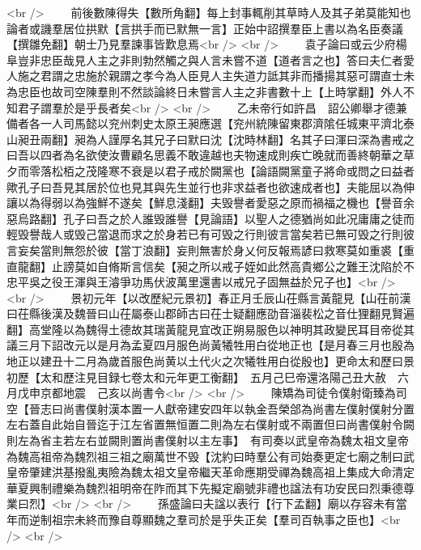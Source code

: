 <br />
　　前後數陳得失【數所角翻】每上封事輒削其草時人及其子弟莫能知也論者或譏羣居位拱默【言拱手而已默無一言】正始中詔撰羣臣上書以為名臣奏議【撰雛免翻】朝士乃見羣諫事皆歎息焉<br />
<br />
　　袁子論曰或云少府楊阜豈非忠臣哉見人主之非則勃然觸之與人言未嘗不道【道者言之也】答曰夫仁者愛人施之君謂之忠施於親謂之孝今為人臣見人主失道力詆其非而播揚其惡可謂直士未為忠臣也故司空陳羣則不然談論終日未嘗言人主之非書數十上【上時掌翻】外人不知君子謂羣於是乎長者矣<br />
<br />
　　乙未帝行如許昌　詔公卿舉才德兼備者各一人司馬懿以兖州刺史太原王昶應選【兖州統陳留東郡濟隂任城東平濟北泰山昶丑兩翻】昶為人謹厚名其兄子曰默曰沈【沈時林翻】名其子曰渾曰深為書戒之曰吾以四者為名欲使汝曹顧名思義不敢違越也夫物速成則疾亡晚就而善終朝華之草夕而零落松栢之茂隆寒不衰是以君子戒於闕黨也【論語闕黨童子將命或問之曰益者歟孔子曰吾見其居於位也見其與先生並行也非求益者也欲速成者也】夫能屈以為伸讓以為得弱以為強鮮不遂矣【鮮息淺翻】夫毁譽者愛惡之原而禍福之機也【譽音余惡烏路翻】孔子曰吾之於人誰毁誰譽【見論語】以聖人之德猶尚如此况庸庸之徒而輕毁譽哉人或毁己當退而求之於身若已有可毁之行則彼言當矣若已無可毁之行則彼言妄矣當則無怨於彼【當丁浪翻】妄則無害於身乂何反報焉諺曰救寒莫如重裘【重直龍翻】止謗莫如自脩斯言信矣【昶之所以戒子姪如此然高貴鄉公之難王沈陷於不忠平吳之役王渾與王濬爭功馬伏波萬里還書以戒兄子固無益於兄子也】<br />
<br />
　　景初元年【以改歷紀元景初】春正月壬辰山茌縣言黃龍見【山茌前漢曰茌縣後漢及魏晉曰山茌屬泰山郡師古曰茌士疑翻應劭音淄裴松之音仕狸翻見賢遍翻】高堂隆以為魏得土德故其瑞黃龍見宜改正朔易服色以神明其政變民耳目帝從其議三月下詔改元以是月為孟夏四月服色尚黃犧牲用白從地正也【是月春三月也殷為地正以建丑十二月為歲首服色尚黄以土代火之次犧牲用白從殷也】更命太和歷曰景初歷【太和歷注見目録七卷太和元年更工衡翻】　五月己巳帝還洛陽己丑大赦　六月戊申京都地震　己亥以尚書令<br />
<br />
　　陳矯為司徒令僕射衛臻為司空【晉志曰尚書僕射漢本置一人獻帝建安四年以執金吾榮郃為尚書左僕射僕射分置左右蓋自此始自晉迄于江左省置無恒置二則為左右僕射或不兩置但曰尚書僕射令闕則左為省主若左右並闕則置尚書僕射以主左事】　有司奏以武皇帝為魏太祖文皇帝為魏高祖帝為魏烈祖三祖之廟萬世不毁【沈約曰時羣公有司始奏更定七廟之制曰武皇帝肇建洪基撥亂夷險為魏太祖文皇帝繼天革命應期受禪為魏高祖上集成大命清定華夏興制禮樂為魏烈祖明帝在阼而其下先擬定廟號非禮也諡法有功安民曰烈秉德尊業曰烈】<br />
<br />
　　孫盛論曰夫諡以表行【行下孟翻】廟以存容未有當年而逆制祖宗未終而豫自尊顯魏之羣司於是乎失正矣【羣司百執事之臣也】<br />
<br />
